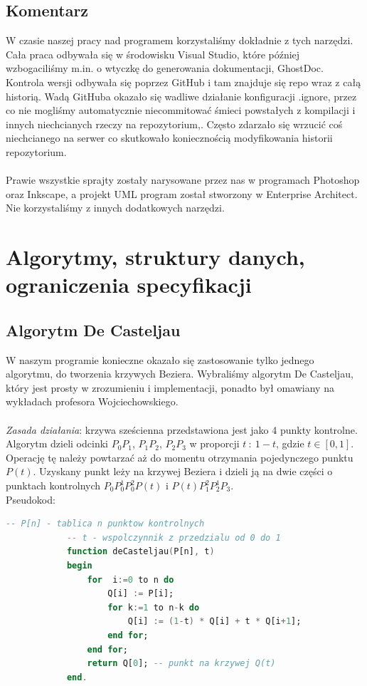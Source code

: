 	\subsection{Komentarz}
		\indent \indent W czasie naszej pracy nad programem korzystaliśmy dokładnie z tych narzędzi. Cała praca odbywała się w środowisku Visual Studio, które później wzbogaciliśmy m.in. o wtyczkę do generowania dokumentacji, GhostDoc. Kontrola wersji odbywała się poprzez GitHub i tam znajduje się repo wraz z całą historią. Wadą GitHuba okazało się wadliwe działanie konfiguracji .ignore, przez co nie mogliśmy automatycznie niecommitować śmieci powstałych z kompilacji i innych niechcianych rzeczy na repozytorium,. Często zdarzało się wrzucić coś niechcianego na serwer co skutkowało koniecznością modyfikowania historii repozytorium.\\\\
		\indent Prawie wszystkie sprajty zostały narysowane przez nas w programach Photoshop oraz Inkscape, a projekt UML program został stworzony w Enterprise Architect. Nie korzystaliśmy z innych dodatkowych narzędzi.
\newpage
\section{Algorytmy, struktury danych, ograniczenia specyfikacji}
	\subsection{Algorytm De Casteljau}
		\indent \indent W naszym programie konieczne okazało się zastosowanie tylko jednego algorytmu, do tworzenia krzywych Beziera. Wybraliśmy algorytm De Casteljau, który jest prosty w zrozumieniu i implementacji, ponadto był omawiany na wykładach profesora Wojciechowskiego.\\\\
		\indent \emph{Zasada działania}: krzywa sześcienna przedstawiona jest jako 4 punkty kontrolne. Algorytm dzieli odcinki $ P_0 P_1 $, $ P_1 P_2 $, $ P_2 P_3 $ w proporcji $ t\: : \: 1-t $, gdzie $ t \in [0, 1] $. Operację tę należy powtarzać aż do momentu otrzymania pojedynczego punktu $ P(t) $. Uzyskany punkt leży na krzywej Beziera i dzieli ją na dwie części o punktach kontrolnych $ P_0 P_0^1 P_0^2 P(t) $ i $ P(t) P_1^2 P_2^1 P_3 $.
		\\
		Pseudokod:
		\begin{lstlisting}[language=Ada, frame=single, autogobble=true, commentstyle=\ttfamily\itshape\color{gray}, frameround=ffff,rulecolor=\color{black}, tabsize=4]
			-- P[n] - tablica n punktow kontrolnych
			-- t - wspolczynnik z przedzialu od 0 do 1
			function deCasteljau(P[n], t)
			begin
				for  i:=0 to n do
					Q[i] := P[i];
					for k:=1 to n-k do
						Q[i] := (1-t) * Q[i] + t * Q[i+1];
					end for;
				end for;
				return Q[0]; -- punkt na krzywej Q(t)
			end.
		\end{lstlisting}
